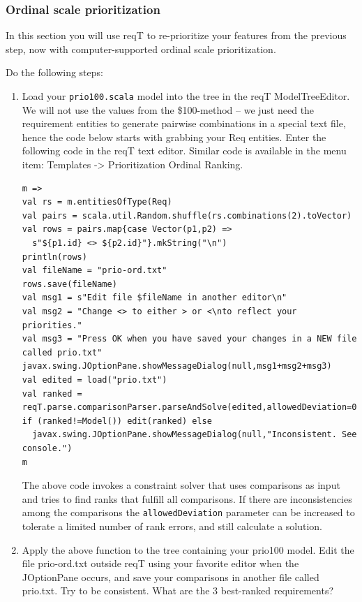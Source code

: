 \documentclass[11pt]{article}
\begin{document}
\subsubsection{Ordinal scale prioritization}

In this section you will use reqT to re-prioritize your features from the previous step, now with computer-supported ordinal scale prioritization. 
\begin{framed}
\noindent Do the following steps: 

\begin{enumerate}
\item Load your \verb+prio100.scala+ model into the tree in the reqT ModelTreeEditor. We will not use the values from the \$100-method -- we just need the requirement entities to generate pairwise combinations in a special text file, hence the code below starts with grabbing your Req entities. Enter the following code in the reqT text editor. Similar code is available in the menu item:  Templates -> Prioritization Ordinal Ranking.
\begin{lstlisting}
m => 
val rs = m.entitiesOfType(Req)
val pairs = scala.util.Random.shuffle(rs.combinations(2).toVector)
val rows = pairs.map{case Vector(p1,p2) => 
  s"${p1.id} <> ${p2.id}"}.mkString("\n")
println(rows)
val fileName = "prio-ord.txt"
rows.save(fileName)
val msg1 = s"Edit file $fileName in another editor\n"
val msg2 = "Change <> to either > or <\nto reflect your priorities."
val msg3 = "Press OK when you have saved your changes in a NEW file called prio.txt"
javax.swing.JOptionPane.showMessageDialog(null,msg1+msg2+msg3)
val edited = load("prio.txt")
val ranked = reqT.parse.comparisonParser.parseAndSolve(edited,allowedDeviation=0)
if (ranked!=Model()) edit(ranked) else 
  javax.swing.JOptionPane.showMessageDialog(null,"Inconsistent. See console.")
m
\end{lstlisting}
The above code invokes a constraint solver that uses comparisons as input and tries to find ranks that fulfill all comparisons. If there are inconsistencies among the comparisons the  \verb+allowedDeviation+ parameter can be increased to tolerate a limited number of rank errors, and still calculate a solution.
\item Apply the above function to the tree containing your prio100 model. Edit the file prio-ord.txt outside reqT using your favorite editor when the JOptionPane occurs, and save your comparisons in another file called prio.txt. Try to be consistent. What are the 3 best-ranked requirements?
\vspace{3em}

\end{enumerate}
\end{framed}
\end{document}
